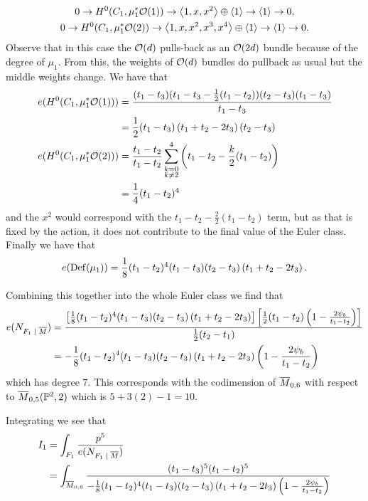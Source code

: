 \documentclass[12pt]{memoir}
\begin{document}
\begin{Ex}
\begin{itemize}
        \begin{gather*}
            0\to H^0(C_1,\mu_1^\ast\mathcal{O}(1))\to\left\langle 1,x,x^2\right\rangle\oplus\left\langle 1\right\rangle\to\left\langle 1\right\rangle\to 0,\\
            0\to H^0(C_1,\mu_1^\ast\mathcal{O}(2))\to\left\langle 1,x,x^2,x^3,x^4\right\rangle\oplus\left\langle 1\right\rangle\to\left\langle 1\right\rangle\to 0.
        \end{gather*}
        Observe that in this case the $\mathcal{O}(d)$ pulls-back as an $\mathcal{O}(2d)$ bundle because of the degree of $\mu_1$. From this, the weights of $\mathcal{O}(d)$ bundles do pullback as usual but the middle weights change. We have that 
        \begin{align*}
        e(H^0(C_1,\mu_1^\ast\cO(1)))&=\frac{(t_1-t_3)(t_1-t_3-\half(t_1-t_2))(t_2-t_3)(t_1-t_3)}{t_1-t_3}\\
        &=\half(t_1-t_3)\left(t_1+t_2-2t_3\right)(t_2-t_3)\\
        e(H^0(C_1,\mu_1^\ast\cO(2)))&=\frac{t_1-t_2}{t_1-t_2}\sum_{\substack{k=0\\ k\neq 2}}^{4}\left(t_1-t_2-\frac{k}{2}(t_1-t_2)\right)\\
        &=\frac{1}{4}(t_1-t_2)^4
        \end{align*}
        and the $x^2$ would correspond with the $t_1-t_2-\frac{2}{2}(t_1-t_2)$ term, but as that is fixed by the action, it does not contribute to the final value of the Euler class.
        Finally we have that 
        $$e(\operatorname{Def}(\mu_1))=\frac{1}{8}(t_1-t_2)^4(t_1-t_3)(t_2-t_3)\left(t_1+t_2-2t_3\right).$$
    \end{itemize}
    Combining this together into the whole Euler class we find that 
    \begin{align*}
    e(N_{F_1\mid\ov M})&=\frac{\bonj{\frac{1}{8}(t_1-t_2)^4(t_1-t_3)(t_2-t_3)\left(t_1+t_2-2t_3\right)}\bonj{\half(t_1-t_2)\left(1-\frac{2\psi_b}{t_1-t_2}\right)}}{\half(t_2-t_1)}\\
    &=-\frac{1}{8}(t_1-t_2)^4(t_1-t_3)(t_2-t_3)\left(t_1+t_2-2t_3\right)\left(1-\frac{2\psi_b}{t_1-t_2}\right)
    \end{align*}
    which has degree $7$. This corresponds with the codimension of $\overline{M}_{0,6}$ with respect to $\overline M_{0,5}(\mathbb{P}^2,2)$ which is $5+3(2)-1=10$.\par
    Integrating we see that
    \begin{align*}
        I_1&=\int_{F_1}\frac{p^5}{e(N_{F_1\mid\ov M})}\\
        &=\int_{\ov M_{0,6}}\frac{(t_1-t_3)^5(t_1-t_2)^5}{-\frac{1}{8}(t_1-t_2)^4(t_1-t_3)(t_2-t_3)\left(t_1+t_2-2t_3\right)\left(1-\frac{2\psi_b}{t_1-t_2}\right)}\\

\end{align*}
\end{Ex}
\end{document}
